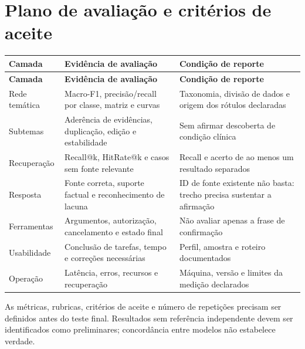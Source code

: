 \documentclass[11pt,a4paper]{article}
\begin{document}
\section{Plano de avaliação e critérios de aceite}
\begingroup\small
\begin{longtable}{>{\raggedright\arraybackslash}p{}>{\raggedright\arraybackslash}p{}>{\raggedright\arraybackslash}p{}}
\toprule
\textbf{Camada} & \textbf{Evidência de avaliação} & \textbf{Condição de reporte} \\ \midrule\endfirsthead
\toprule
\textbf{Camada} & \textbf{Evidência de avaliação} & \textbf{Condição de reporte} \\ \midrule\endhead
\bottomrule\endfoot
Rede temática & Macro-F1, precisão/recall por classe, matriz e curvas & Taxonomia, divisão de dados e origem dos rótulos declaradas \\[3pt]
Subtemas & Aderência de evidências, duplicação, edição e estabilidade & Sem afirmar descoberta de condição clínica \\[3pt]
Recuperação & Recall@k, HitRate@k e casos sem fonte relevante & Recall e acerto de ao menos um resultado separados \\[3pt]
Resposta & Fonte correta, suporte factual e reconhecimento de lacuna & ID de fonte existente não basta: trecho precisa sustentar a afirmação \\[3pt]
Ferramentas & Argumentos, autorização, cancelamento e estado final & Não avaliar apenas a frase de confirmação \\[3pt]
Usabilidade & Conclusão de tarefas, tempo e correções necessárias & Perfil, amostra e roteiro documentados \\[3pt]
Operação & Latência, erros, recursos e recuperação & Máquina, versão e limites da medição declarados \\[3pt]
\end{longtable}
\endgroup
As métricas, rubricas, critérios de aceite e número de repetições precisam ser definidos antes do teste final. Resultados sem referência independente devem ser identificados como preliminares; concordância entre modelos não estabelece verdade.
\end{document}
